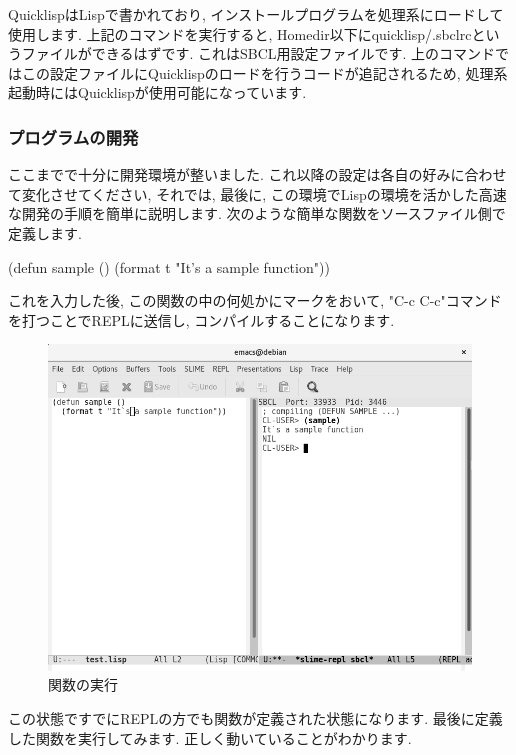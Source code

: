 \documentclass[mingoth,a4paper]{jsarticle}
\begin{document}
QuicklispはLispで書かれており, インストールプログラムを処理系にロードして使用します. 上記のコマンドを実行すると, Homedir以下にquicklisp/.sbclrcというファイルができるはずです. これはSBCL用設定ファイルです. 上のコマンドではこの設定ファイルにQuicklispのロードを行うコードが追記されるため, 処理系起動時にはQuicklispが使用可能になっています. 

\subsubsection{プログラムの開発}
ここまでで十分に開発環境が整いました. これ以降の設定は各自の好みに合わせて変化させてください, それでは, 最後に, この環境でLispの環境を活かした高速な開発の手順を簡単に説明します. 
次のような簡単な関数をソースファイル側で定義します. 

\begin{commandline}
(defun sample ()
	(format t "It's a sample function"))
\end{commandline}

これを入力した後, この関数の中の何処かにマークをおいて, "C-c C-c"コマンドを打つことでREPLに送信し, コンパイルすることになります. 

\begin{figure}[htbp!]
\centering
\includegraphics[scale=0.5]{image201709-kansai/do_gray.png}
\caption{関数の実行}
\end{figure}

この状態ですでにREPLの方でも関数が定義された状態になります. 
最後に定義した関数を実行してみます. 
正しく動いていることがわかります. 
\end{document}
